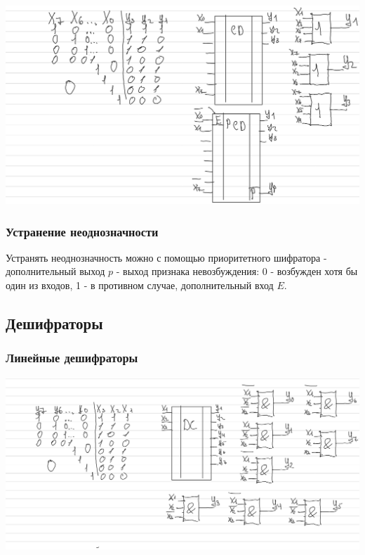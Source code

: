 \documentclass{article}
\begin{document}
\begin{flushleft}

\includegraphics[width=\textwidth]{assets/coder.png}

\subsubsection{Устранение неоднозначности}

Устранять неоднозначность можно с помощью приоритетного шифратора - дополнительный выход $p$ - выход признака невозбуждения: 0 - возбужден хотя бы один из входов, 1 - в противном случае, дополнительный вход $E$.

\subsection{Дешифраторы}

\subsubsection{Линейные дешифраторы}

\includegraphics[width=\textwidth]{assets/decoder.png}

\hfill


\end{flushleft}
\end{document}

